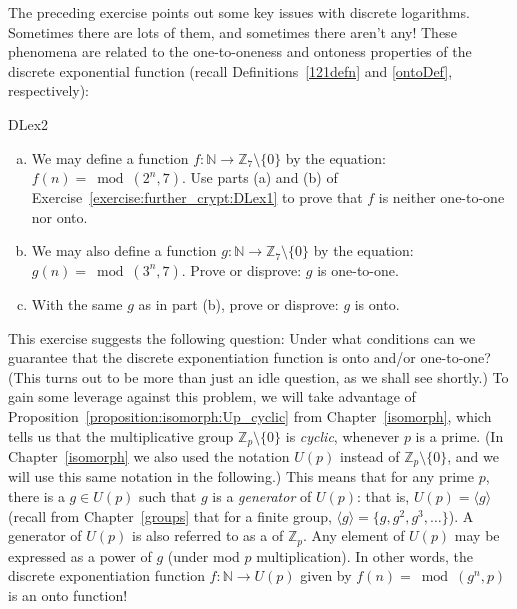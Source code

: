 The preceding exercise points out some key issues with discrete logarithms. Sometimes there are lots of them, and sometimes there aren't any! These phenomena are related to the one-to-oneness and ontoness properties of  the discrete exponential function (recall Definitions~\ref{121defn} and \ref{ontoDef}, respectively):

\begin{exercise}{DLex2}
\begin{enumerate}[(a)]
\item
We may define a function $f: \mathbb{N} \rightarrow \mathbb{Z}_7 \setminus \{0\}$ by the equation: $f(n) = \bmod(2^n,7)$. 
Use parts (a) and (b) of Exercise~\ref{exercise:further_crypt:DLex1} to prove that $f$ is neither one-to-one nor onto.
\item
We may also define a function $g: \mathbb{N} \rightarrow \mathbb{Z}_7 \setminus \{0\}$ by the equation: $g(n) = \bmod(3^n,7)$. 
Prove or disprove: $g$ is one-to-one.
\item
With the same $g$ as in part (b), prove or disprove: $g$ is onto.
\end{enumerate}
\end{exercise}

This exercise suggests the following question:  Under what conditions can we guarantee that the discrete exponentiation function is onto and/or one-to-one? (This turns out to be more than just an idle question, as we shall see shortly.)  To gain some leverage against this problem, we will take advantage of   Proposition~\ref{proposition:isomorph:Up_cyclic} from Chapter~\ref{isomorph}, which tells us that the multiplicative group $\mathbb{Z}_p\setminus \{0\}$ is \emph{cyclic}, whenever $p$ is a prime. (In Chapter~\ref{isomorph} we also used the notation $U(p)$ instead of $\mathbb{Z}_p\setminus \{0\}$, and we will use this same notation in the following.) This means that for any prime $p$, there is a $g \in U(p)$  such that $g$ is a \emph{generator} of  $U(p)$: that is, $U(p) = \langle g \rangle$ (recall from Chapter~\ref{groups} that for a finite group, $\langle g \rangle = \{g, g^2, g^3, \ldots \}$). A generator of $U(p)$ is also referred to as a  of $\mathbb{Z}_p$. Any element of $U(p)$ may be expressed as a power of $g$ (under mod $p$ multiplication).  In other words, the discrete exponentiation function $f: \mathbb{N} \rightarrow U(p)$ given by $f(n) = \bmod(g^n,p)$ is an onto function!  

